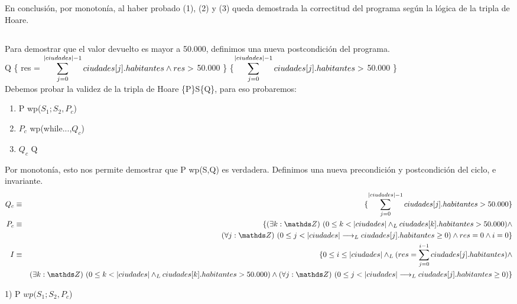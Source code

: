 \documentclass[10pt,a4paper,fleqn]{article}
\begin{document}
\noindent En conclusión, por monotonía, al haber probado (1), (2) y (3) queda demostrada la correctitud del programa según la lógica de la tripla de Hoare.
\subsection{}
Para demostrar que el valor devuelto es mayor a 50.000, definimos una nueva postcondición del programa. 
\vspace{2,5mm}\\
Q \equiv \{ res = $\small \displaystyle \sum_{j=0}^{|ciudades|-1} ciudades[j].habitantes \land res >$ 50.000 \} \equiv \{$\small \displaystyle \sum_{j=0}^{|ciudades|-1} ciudades[j].habitantes >$ 50.000 \}\\
Debemos probar la validez de la tripla de Hoare \{P\}S\{Q\}, para eso probaremos:
\begin{enumerate}
    \item P \implica wp($S_1;S_2, P_c$)
    \item $P_c$ \implica wp(while...,$Q_c$)
    \item $Q_c$ \implica Q
\end{enumerate}
Por monotonía, esto nos permite demostrar que P \implica wp(S,Q) es verdadera. Definimos una nueva precondición y postcondición del ciclo, e invariante.\\
\begin{eqnarray}
    Q_c &\equiv& \{\small \displaystyle \sum_{j=0}^{|ciudades|-1} ciudades[j].habitantes > 50.000\} \notag \\
    P_c &\equiv& \{ \existe[unalinea]{k}{\ent}{0 \leq k< |ciudades| \yLuego ciudades[k].habitantes >  50.000 }\land \notag \\ 
    & & \paraTodo[unalinea]{j}{\ent}{0\leq j < |ciudades| \implicaLuego ciudades[j].habitantes \geq 0} \land res=0 \land i=0 \} \notag \\
    I &\equiv& \{ 0 \leq i \leq |ciudades| \yLuego (res = \small \displaystyle \sum_{j=0}^{i-1} ciudades[j].habitantes) \land \notag \\
    & & \existe[unalinea]{k}{\ent}{0 \leq k< |ciudades| \yLuego ciudades[k].habitantes >  50.000 }\land \paraTodo[unalinea]{j}{\ent}{0 \leq j < |ciudades| \implicaLuego ciudades[j].habitantes \geq 0} \} \notag 
\end{eqnarray}
\item 1) P \implica $wp(S_1;S_2, P_c$)\\ \vspace{-10mm}
\end{document}
